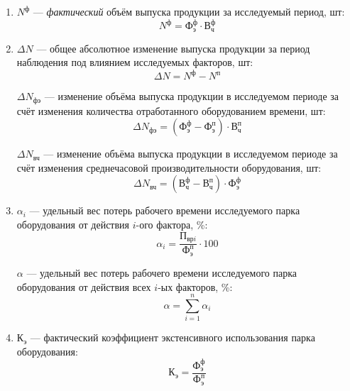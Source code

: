 \begin{enumerate}
  \item $ N^{\text{ф}} $ --- \textit{фактический} объём выпуска продукции за исследуемый период, шт:
    \begin{equation*}
      N^{\text{ф}} = \text{Ф}^{\text{ф}}_{\text{э}} \cdot \text{В}^{\text{ф}}_{\text{ч}}
    \end{equation*}

  \item $ \Delta N $ --- общее абсолютное изменение выпуска продукции за период наблюдения
    под влиянием исследуемых факторов, шт:
    \begin{equation*}
      \Delta N = N^{\text{ф}} - N^{\text{п}}
    \end{equation*}

    $ \Delta N_{\text{фэ}} $ --- изменение объёма выпуска продукции в исследуемом периоде
    за счёт изменения количества отработанного оборудованием времени, шт:
    \begin{equation*}
      \Delta N_{\text{фэ}} = (\text{Ф}^{\text{ф}}_{\text{э}} - \text{Ф}^{\text{п}}_{\text{э}}) \cdot \text{В}^{\text{п}}_{\text{ч}}
    \end{equation*}

    $ \Delta N_{\text{вч}} $ --- изменение объёма выпуска продукции в исследуемом периоде
    за счёт изменения среднечасовой производительности оборудования, шт:
    \begin{equation*}
      \Delta N_{\text{вч}} = (\text{В}^{\text{ф}}_{\text{ч}} - \text{В}^{\text{п}}_{\text{ч}}) \cdot \text{Ф}^{\text{ф}}_{\text{э}}
    \end{equation*}

  \item $ \alpha_i $ --- удельный вес потерь рабочего времени исследуемого парка оборудования от
    действия $i$-ого фактора, \%:
    \begin{equation*}
      \alpha_i = \dfrac{\text{П}_{\text{вр}i}}{\text{Ф}^{\text{п}}_{\text{э}}} \cdot 100
    \end{equation*}

    $ \alpha $ --- удельный вес потерь рабочего времени исследуемого парка оборудования
    от действия всех $i$-ых факторов, \%:
    \begin{equation*}
      \alpha = \sum\limits^{n}_{i=1}\alpha_i
    \end{equation*}

  \item $ \text{К}_{\text{э}} $ --- фактический коэффициент экстенсивного использования парка оборудования:
    \begin{equation*}
      \text{К}_{\text{э}} = \dfrac{\text{Ф}^{\text{ф}}_{\text{э}}}{\text{Ф}^{\text{п}}_{\text{э}}}
    \end{equation*}


\end{enumerate}

